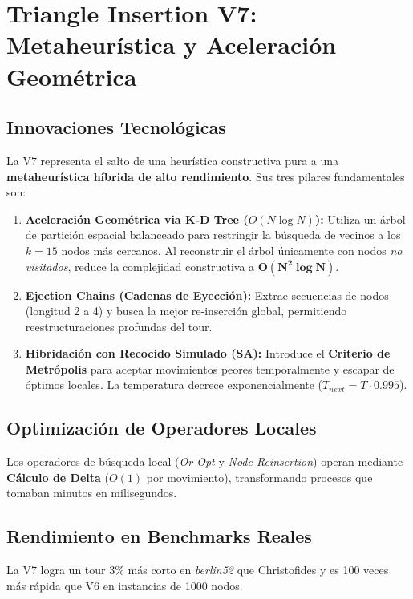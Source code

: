 \documentclass[12pt, a4paper]{article}
\begin{document}
\section{Triangle Insertion V7: Metaheurística y Aceleración Geométrica}

\subsection{Innovaciones Tecnológicas}
La V7 representa el salto de una heurística constructiva pura a una \textbf{metaheurística híbrida de alto rendimiento}. Sus tres pilares fundamentales son:

\begin{enumerate}
    \item \textbf{Aceleración Geométrica via K-D Tree ($O(N \log N)$):} Utiliza un árbol de partición espacial balanceado para restringir la búsqueda de vecinos a los $k=15$ nodos más cercanos. Al reconstruir el árbol únicamente con nodos \textit{no visitados}, reduce la complejidad constructiva a $\mathbf{O(N^2 \log N)}$.
    
    \item \textbf{Ejection Chains (Cadenas de Eyección):} Extrae secuencias de nodos (longitud 2 a 4) y busca la mejor re-inserción global, permitiendo reestructuraciones profundas del tour.
    
    \item \textbf{Hibridación con Recocido Simulado (SA):} Introduce el \textbf{Criterio de Metrópolis} para aceptar movimientos peores temporalmente y escapar de óptimos locales. La temperatura decrece exponencialmente ($T_{next} = T \cdot 0.995$).
\end{enumerate}

\subsection{Optimización de Operadores Locales}
Los operadores de búsqueda local (\textit{Or-Opt} y \textit{Node Reinsertion}) operan mediante \textbf{Cálculo de Delta} ($O(1)$ por movimiento), transformando procesos que tomaban minutos en milisegundos.

\subsection{Rendimiento en Benchmarks Reales}
La V7 logra un tour 3\% más corto en \textit{berlin52} que Christofides y es 100 veces más rápida que V6 en instancias de 1000 nodos.
\end{document}
